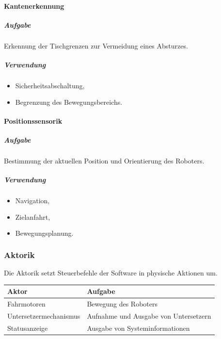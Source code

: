 \paragraph{Kantenerkennung}\label{kantenerkennung}

\subparagraph{Aufgabe}\label{aufgabe-4}

Erkennung der Tischgrenzen zur Vermeidung eines Absturzes.

\subparagraph{Verwendung}\label{verwendung-1}

\begin{itemize}
\tightlist
\item
  Sicherheitsabschaltung,
\item
  Begrenzung des Bewegungsbereichs.
\end{itemize}

\paragraph{Positionssensorik}\label{positionssensorik-1}

\subparagraph{Aufgabe}\label{aufgabe-5}

Bestimmung der aktuellen Position und Orientierung des Roboters.

\subparagraph{Verwendung}\label{verwendung-2}

\begin{itemize}
\tightlist
\item
  Navigation,
\item
  Zielanfahrt,
\item
  Bewegungsplanung.
\end{itemize}

\subsubsection{Aktorik}\label{aktorik-1}

Die Aktorik setzt Steuerbefehle der Software in physische Aktionen um.

\begin{longtable}[]{@{}ll@{}}
\toprule\noalign{}
Aktor & Aufgabe \\
\midrule\noalign{}
\endhead
\bottomrule\noalign{}
\endlastfoot
Fahrmotoren & Bewegung des Roboters \\
Untersetzermechanismus & Aufnahme und Ausgabe von Untersetzern \\
Statusanzeige & Ausgabe von Systeminformationen \\
\end{longtable}

